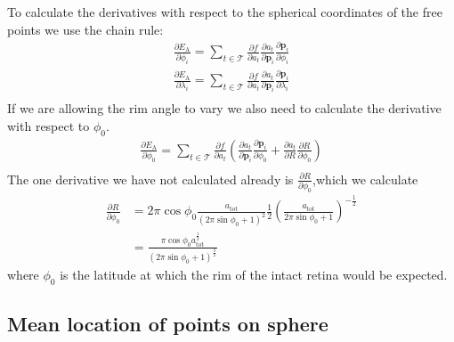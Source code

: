 \documentclass{article}
\newcommand{\EA}{\ensuremath{E_\mathrm{A}}\xspace}
\renewcommand{\vec}[1]{\mathbf{#1}}
\begin{document}
To calculate the derivatives with respect to the spherical coordinates
of the free points we use the chain rule:
\begin{equation}
  \label{retistruct-algorithm:eq:12}
  \begin{split}
  \frac{\partial \EA}{\partial \phi_i} = \sum_{t \in \mathcal{T}}
  \frac{\partial f}{\partial a_t}\frac{\partial a_t}{\partial
    \vec{p}_i}\frac{\partial \vec{p}_i}{\partial \phi_i} \\
  \frac{\partial \EA}{\partial \lambda_i} = \sum_{t \in \mathcal{T}}
  \frac{\partial f}{\partial a_t}\frac{\partial a_t}{\partial
    \vec{p}_i}\frac{\partial \vec{p}_i}{\partial \lambda_i} \\
  \end{split}
\end{equation}
If we are allowing the rim angle to vary we also need to calculate the
derivative with respect to $\phi_0$.
\begin{equation}
  \label{retistruct-algorithm:eq:12}
  \begin{split}
  \frac{\partial \EA}{\partial \phi_0} = \sum_{t \in \mathcal{T}}
  \frac{\partial f}{\partial a_t}
  \left(\frac{\partial a_t}{\partial \vec{p}_i}\frac{\partial
      \vec{p}_i}{\partial \phi_0} +
    \frac{\partial a_t}{\partial R}\frac{\partial
      R}{\partial \phi_0} 
  \right)\\
  \end{split}
\end{equation}
The one derivative we have not calculated already is $\frac{\partial
  R}{\partial \phi_0}$,which we calculate 
\begin{equation}
  \label{retistruct-algorithm:eq:15}
  \begin{split}
  \frac{\partial R}{\partial \phi_0} & = 2\pi\cos\phi_0
  \frac{a_\mathrm{tot}}{(2\pi\sin\phi_0 +1)^2}
  \frac{1}{2}\left(\frac{a_\mathrm{tot}}{2\pi\sin\phi_0+1}\right)^{-\frac{1}{2}}
  \\
  & =
  \frac{ \pi\cos\phi_0 a_\mathrm{tot}^{\frac{1}{2}}}{(2\pi\sin\phi_0 +1)^{\frac{3}{2}}}
    \end{split}
\end{equation}
where $\phi_0$ is the latitude at which the rim of the intact retina
would be expected.

\subsection{Mean location of points on sphere}
\label{fold-sphere:sec:mean-location-points}
\end{document}
